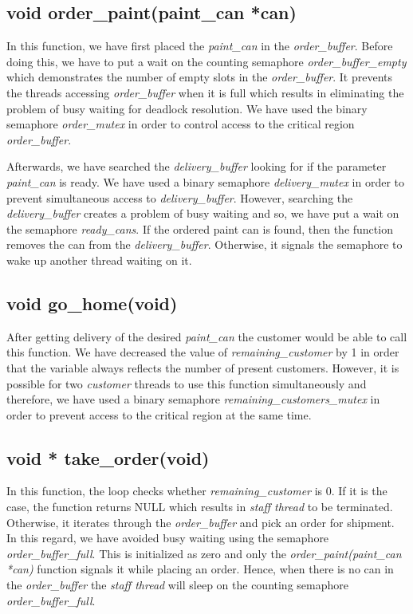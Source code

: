 \documentclass[a4paper]{article}
\begin{document}
\subsection{void order\_paint(paint\_can *can)}
In this function, we have first placed the \textit{paint\_can} in the \textit{order\_buffer}. Before doing this, we have to put a wait on the counting semaphore \textit{order\_buffer\_empty} which demonstrates the number of empty slots in the \textit{order\_buffer}. It prevents the threads accessing \textit{order\_buffer} when it is full which results in eliminating the problem of busy waiting for deadlock resolution. We have used the binary semaphore \textit{order\_mutex} in order to control access to the critical region \textit{order\_buffer}.

Afterwards, we have searched the \textit{delivery\_buffer} looking for if the parameter \textit{paint\_can} is ready. We have used a binary semaphore \textit{delivery\_mutex} in order to prevent simultaneous access to \textit{delivery\_buffer}. However, searching the \textit{delivery\_buffer} creates a problem of busy waiting and so, we have put a wait on the semaphore \textit{ready\_cans}. If the ordered paint can is found, then the function removes the can from the \textit{delivery\_buffer}. Otherwise, it signals the semaphore to wake up another thread waiting on it. 

\subsection{void go\_home(void)}
After getting delivery of the desired \textit{paint\_can} the customer would be able to call this function. We have decreased the value of \textit{remaining\_customer} by 1 in order that the variable always reflects the number of present customers. However, it is possible for two \textit{customer} threads to use this function simultaneously and therefore, we have used a binary semaphore \textit{remaining\_customers\_mutex} in order to prevent access to the critical region at the same time.

\subsection{void * take\_order(void)}
In this function, the loop checks whether \textit{remaining\_customer} is 0. If it is the case, the function returns NULL which results in \textit{staff thread} to be terminated. Otherwise, it iterates through the \textit{order\_buffer} and pick an order for shipment. In this regard, we have avoided busy waiting using the semaphore \textit{order\_buffer\_full}. This is initialized as zero and only the \textit{order\_paint(paint\_can *can)} function signals it while placing an order. Hence, when there is no can in the \textit{order\_buffer} the \textit{staff thread} will sleep on the counting semaphore \textit{order\_buffer\_full}.
\end{document}
